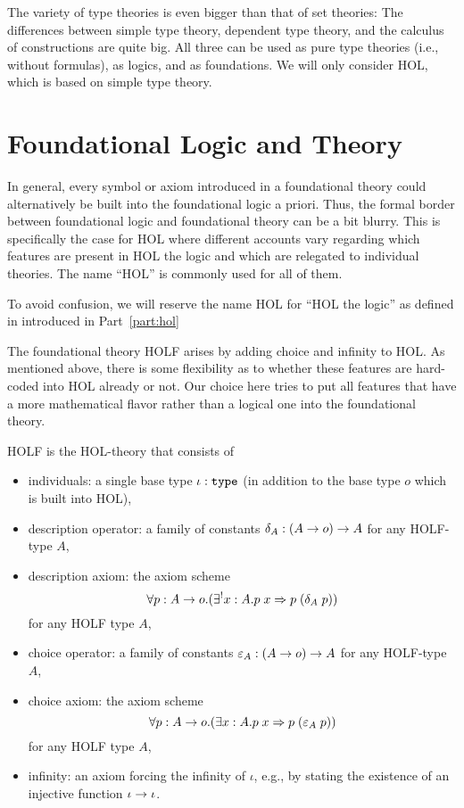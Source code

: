 The variety of type theories is even bigger than that of set theories: The differences between simple type theory, dependent type theory, and the calculus of constructions are quite big. All three can be used as pure type theories (i.e., without formulas), as logics, and as foundations. We will only consider HOL, which is based on simple type theory.

\section{Foundational Logic and Theory}

In general, every symbol or axiom introduced in a foundational theory could alternatively be built into the foundational logic a priori. Thus, the formal border between foundational logic and foundational theory can be a bit blurry. This is specifically the case for HOL where different accounts vary regarding which features are present in HOL the logic and which are relegated to individual theories. The name ``HOL'' is commonly used for all of them.

To avoid confusion, we will reserve the name HOL for ``HOL the logic'' as defined in introduced in Part~\ref{part:hol}

The foundational theory HOLF arises by adding choice and infinity to HOL. As mentioned above, there is some flexibility as to whether these features are hard-coded into HOL already or not. Our choice here tries to put all features that have a more mathematical flavor rather than a logical one into the foundational theory.

\begin{definition}
HOLF is the HOL-theory that consists of
\begin{itemize}
 \item individuals: a single base type $\iota:\mathtt{type}$ (in addition to the base type $o$ which is built into HOL),
 \item description operator: a family of constants $\delta_A:(A\rightarrow o)\rightarrow A$ for any HOLF-type $A$,
 \item description axiom: the axiom scheme
  \[\forall p:A\rightarrow o.(\exists^! x:A.p\; x \Rightarrow p\;(\delta_A\;p))\]
   for any HOLF type $A$,
 \item choice operator: a family of constants $\varepsilon_A:(A\rightarrow o)\rightarrow A$ for any HOLF-type $A$,
 \item choice axiom: the axiom scheme
  \[\forall p:A\rightarrow o.(\exists x:A.p\; x \Rightarrow p\;(\varepsilon_A\;p))\]
   for any HOLF type $A$,
 \item infinity: an axiom forcing the infinity of $\iota$, e.g., by stating the existence of an injective function $\iota\rightarrow\iota$.
\end{itemize}
\end{definition}

